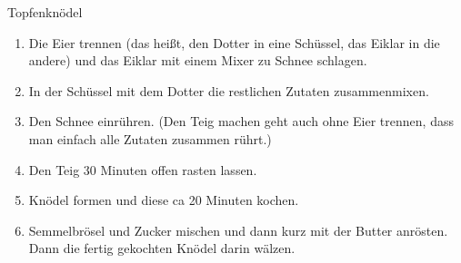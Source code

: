 \documentclass{article}
\begin{document}
\begin{recipe}{Topfenknödel}{}{}



\begin{enumerate}
\item Die Eier trennen (das heißt, den Dotter in eine Schüssel, das Eiklar in die andere) und das Eiklar mit einem Mixer zu Schnee schlagen. 
\item In der Schüssel mit dem Dotter die restlichen Zutaten zusammenmixen.
\item Den Schnee einrühren. (Den Teig machen geht auch ohne Eier trennen, dass man einfach alle Zutaten zusammen rührt.)
\item Den Teig 30 Minuten offen rasten lassen.
\item Knödel formen und diese ca 20 Minuten kochen.
\item Semmelbrösel und Zucker mischen und dann kurz mit der Butter anrösten. Dann die fertig gekochten Knödel darin wälzen.

\end{enumerate}
\end{recipe}
\end{document}
